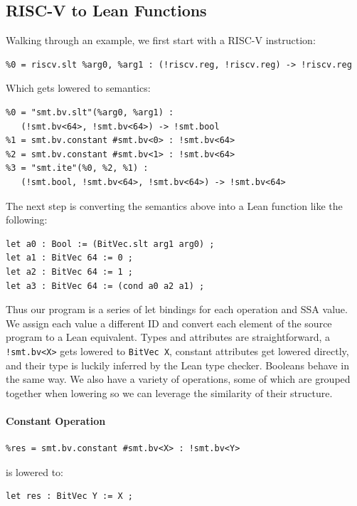 \subsection{RISC-V to Lean Functions}

Walking through an example, we first start with a RISC-V instruction:
\begin{verbatim}
%0 = riscv.slt %arg0, %arg1 : (!riscv.reg, !riscv.reg) -> !riscv.reg 
\end{verbatim}

Which gets lowered to semantics:
\begin{verbatim}
%0 = "smt.bv.slt"(%arg0, %arg1) : 
   (!smt.bv<64>, !smt.bv<64>) -> !smt.bool
%1 = smt.bv.constant #smt.bv<0> : !smt.bv<64>
%2 = smt.bv.constant #smt.bv<1> : !smt.bv<64>
%3 = "smt.ite"(%0, %2, %1) : 
   (!smt.bool, !smt.bv<64>, !smt.bv<64>) -> !smt.bv<64>
\end{verbatim}

The next step is converting the semantics above into a Lean function like the following:
\begin{verbatim}
let a0 : Bool := (BitVec.slt arg1 arg0) ;
let a1 : BitVec 64 := 0 ;
let a2 : BitVec 64 := 1 ;
let a3 : BitVec 64 := (cond a0 a2 a1) ;
\end{verbatim}

Thus our program is a series of let bindings for each operation and SSA value. We assign each
value a different ID and convert each element of the source program to a Lean equivalent.
%
Types and attributes are straightforward, a \texttt{!smt.bv<X>} gets lowered to \texttt{BitVec X},
constant attributes get lowered directly, and their type is luckily inferred by the Lean type checker.
Booleans behave in the same way.
%
We also have a variety of operations, some of which are grouped together when lowering so we can leverage
the similarity of their structure.

\paragraph{Constant Operation}
\begin{verbatim}
%res = smt.bv.constant #smt.bv<X> : !smt.bv<Y>
\end{verbatim}
is lowered to:
\begin{verbatim}
let res : BitVec Y := X ;
\end{verbatim}

